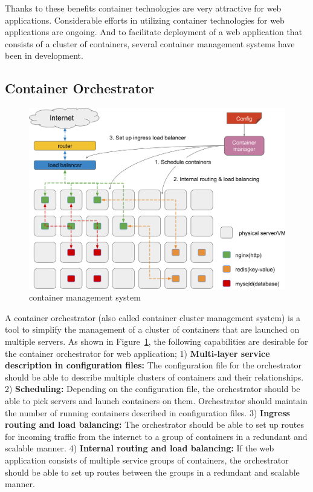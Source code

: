 Thanks to these benefits container technologies are very attractive for web applications.
Considerable efforts in utilizing container technologies for web applications are ongoing.
And to facilitate deployment of a web application that consists of a cluster of containers, several container management systems have been in development.

\subsection{Container Orchestrator}

\begin{figure}[h]
\begin{center}
\includegraphics[width=0.9\columnwidth]{Figs/container_management_system}
\end{center}
\caption{
container management system
}

\label{fig:container_management_system}
\end{figure}

A container orchestrator (also called container cluster management system) is a tool to simplify the management of a cluster of containers that are launched on multiple servers.
As shown in Figure~\ref{fig:container_management_system}, the following capabilities are desirable for the container orchestrator for web application;
1) {\bf Multi-layer service description in configuration files:} The configuration file for the orchestrator should be able to describe multiple clusters of containers and their relationships.
2) {\bf Scheduling:} Depending on the configuration file, the orchestrator should be able to pick servers and launch containers on them. Orchestrator should maintain the number of running containers described in configuration files.
3) {\bf Ingress routing and load balancing:} The orchestrator should be able to set up routes for incoming traffic from the internet to a group of containers in a redundant and scalable manner.
4) {\bf Internal routing and load balancing:} If the web application consists of multiple service groups of containers, the orchestrator should be able to set up routes between the groups in a redundant and scalable manner.

